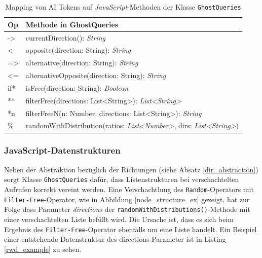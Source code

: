 \documentclass[conference]{IEEEtran}
\begin{document}
\begin{table}[!htb]
\caption{Mapping von AI Tokens auf \emph{JavaScript}-Methoden der Klasse \texttt{GhostQueries}}
\label{token_method_mapping}
\centering
\setlength\tabcolsep{1.5pt}
\begin{tabular}{|l||l|}

\hline
\textbf{Op} & \textbf{Methode in GhostQueries}\\

\hline
-> & currentDirection(): \emph{String} \\

\hline
<- & opposite(direction: String): \emph{String} \\

\hline
=> & alternative(direction: String): \emph{String} \\

\hline
<= & alternativeOpposite(direction: String): \emph{String} \\

\hline
if* & isFree(direction: String): \emph{Boolean} \\

\hline
** & filterFree(directions: List<String>): \emph{List<String>} \\

\hline
*n & filterFreeN(n: Number, directions: List<String>): \emph{String} \\

\hline
\% & randomWithDistribution(ratios: \emph{List<Number>}, dirs: \emph{List<String>})\\

\hline
\end{tabular}
\end{table}

\subsubsection{JavaScript-Datenstrukturen}
Neben der Abstraktion bezüglich der Richtungen (siehe Absatz \ref{dir_abstraction}) sorgt Klasse \texttt{GhostQueries} dafür, dass Listenstrukturen bei verschachtelten Aufrufen korrekt vereint werden. Eine Verschachtlung des \texttt{Random}-Operators mit \texttt{Filter-Free}-Operator, wie in
Abbildung \ref{node_structure_ex} gezeigt, hat zur Folge dass Parameter \emph{directions} der \texttt{randomWithDistributions()}-Methode mit einer verschachtelten Liste
befüllt wird. Die Ursache ist, dass es sich beim Ergebnis des \texttt{Filter-Free}-Operator ebenfalls um eine Liste handelt. Ein Beispiel einer entstehende Datenstruktur des directions-Parameter ist in Listing \ref{rwd_example} zu sehen.
\end{document}
